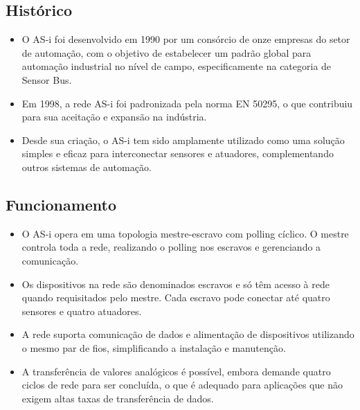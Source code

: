 \documentclass[a4paper,11pt]{article} %
\begin{document}
\subsection{Histórico}
\begin{itemize}
    \item O AS-i foi desenvolvido em 1990 por um consórcio de onze empresas do setor de automação, com o objetivo de estabelecer um padrão global para automação industrial no nível de campo, especificamente na categoria de Sensor Bus.
    \item Em 1998, a rede AS-i foi padronizada pela norma EN 50295, o que contribuiu para sua aceitação e expansão na indústria.
    \item Desde sua criação, o AS-i tem sido amplamente utilizado como uma solução simples e eficaz para interconectar sensores e atuadores, complementando outros sistemas de automação.
\end{itemize}

\subsection{Funcionamento}
\begin{itemize}
    \item O AS-i opera em uma topologia mestre-escravo com polling cíclico. O mestre controla toda a rede, realizando o polling nos escravos e gerenciando a comunicação.
    \item Os dispositivos na rede são denominados escravos e só têm acesso à rede quando requisitados pelo mestre. Cada escravo pode conectar até quatro sensores e quatro atuadores.
    \item A rede suporta comunicação de dados e alimentação de dispositivos utilizando o mesmo par de fios, simplificando a instalação e manutenção.
    \item A transferência de valores analógicos é possível, embora demande quatro ciclos de rede para ser concluída, o que é adequado para aplicações que não exigem altas taxas de transferência de dados.
\end{itemize}
\end{document}
